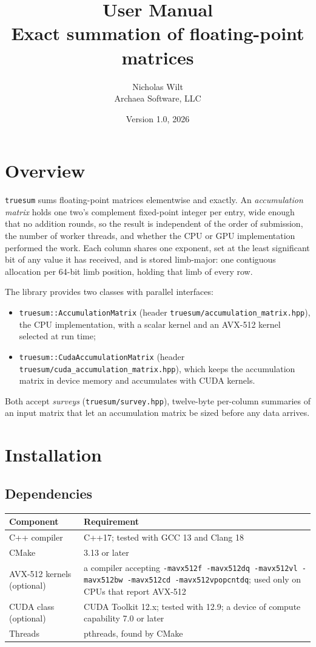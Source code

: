 \documentclass[11pt]{article}
\title{\code{truesum} User Manual\\[4pt]\large Exact summation of floating-point matrices}
\author{Nicholas Wilt\\Archaea Software, LLC\\\code{nicholas@archaeasoftware.com}}
\date{Version 1.0, 2026}
\newcommand{\code}[1]{\texttt{#1}}
\begin{document}
\maketitle
\tableofcontents

\section{Overview}

\code{truesum} sums floating-point matrices elementwise and exactly. An \emph{accumulation matrix} holds one two's complement fixed-point integer per entry, wide enough that no addition rounds, so the result is independent of the order of submission, the number of worker threads, and whether the CPU or GPU implementation performed the work. Each column shares one exponent, set at the least significant bit of any value it has received, and is stored limb-major: one contiguous allocation per 64-bit limb position, holding that limb of every row.

The library provides two classes with parallel interfaces:
\begin{itemize}
\item \code{truesum::AccumulationMatrix} (header \code{truesum/accumulation\_matrix.hpp}), the CPU implementation, with a scalar kernel and an AVX-512 kernel selected at run time;
\item \code{truesum::CudaAccumulationMatrix} (header \code{truesum/cuda\_accumulation\_matrix.hpp}), which keeps the accumulation matrix in device memory and accumulates with CUDA kernels.
\end{itemize}
Both accept \emph{surveys} (\code{truesum/survey.hpp}), twelve-byte per-column summaries of an input matrix that let an accumulation matrix be sized before any data arrives.

\section{Installation}

\subsection{Dependencies}

\begin{tabular}{ll}
\toprule
Component & Requirement \\
\midrule
C++ compiler & C++17; tested with GCC 13 and Clang 18 \\
CMake & 3.13 or later \\
AVX-512 kernels (optional) & a compiler accepting \code{-mavx512f -mavx512dq -mavx512vl -mavx512bw -mavx512cd -mavx512vpopcntdq}; used only on CPUs that report AVX-512 \\
CUDA class (optional) & CUDA Toolkit 12.x; tested with 12.9; a device of compute capability 7.0 or later \\
Threads & pthreads, found by CMake \\
\bottomrule
\end{tabular}
\end{document}
